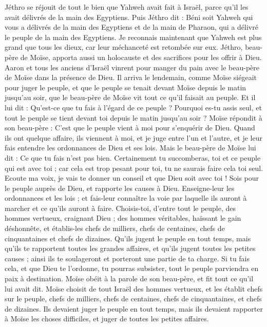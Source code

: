 \begin{multicols}{2}
Jéthro se réjouit de tout le bien que Yahweh avait fait à Israël, parce qu'il les avait délivrés de la main des Egyptiens.
Puis Jéthro dit : Béni soit Yahweh qui vous a délivrés de la main des Egyptiens et de la main de Pharaon, qui a délivré le peuple de la main des Egyptiens.
Je reconnais maintenant que Yahweh est plus grand que tous les dieux, car leur méchanceté est retombée sur eux.
Jéthro, beau-père de Moïse, apporta aussi un holocauste et des sacrifices pour les offrir à Dieu. Aaron et tous les anciens d'Israël vinrent pour manger du pain avec le beau-père de Moïse dans la présence de Dieu.
Il arriva le lendemain, comme Moïse siégeait pour juger le peuple, et que le peuple se tenait devant Moïse depuis le matin jusqu'au soir,
que le beau-père de Moïse vit tout ce qu'il faisait au peuple. Et il lui dit : Qu'est-ce que tu fais à l'égard de ce peuple ? Pourquoi es-tu assis seul, et tout le peuple se tient devant toi depuis le matin jusqu'au soir ?
Moïse répondit à son beau-père : C'est que le peuple vient à moi pour s'enquérir de Dieu.
Quand ils ont quelque affaire, ils viennent à moi, et je juge entre l'un et l'autre, et je leur fais entendre les ordonnances de Dieu et ses lois.
Mais le beau-père de Moïse lui dit : Ce que tu fais n'est pas bien.
Certainement tu succomberas, toi et ce peuple qui est avec toi ; car cela est trop pesant pour toi, tu ne saurais faire cela toi seul.
Ecoute ma voix, je vais te donner un conseil et que Dieu soit avec toi ! Sois pour le peuple auprès de Dieu, et rapporte les causes à Dieu.
Enseigne-leur les ordonnances et les lois ; et fais-leur connaître la voie par laquelle ils auront à marcher et ce qu'ils auront à faire.
Choisis-toi, d'entre tout le peuple, des hommes vertueux, craignant Dieu ; des hommes véritables, haïssant le gain déshonnête, et établis-les chefs de milliers, chefs de centaines, chefs de cinquantaines et chefs de dizaines.
Qu'ils jugent le peuple en tout temps, mais qu'ils te rapportent toutes les grandes affaires, et qu'ils jugent toutes les petites causes ; ainsi ils te soulageront et porteront une partie de ta charge.
Si tu fais cela, et que Dieu te l’ordonne, tu pourras subsister, tout le peuple parviendra en paix à destination.
Moïse obéit à la parole de son beau-père, et fit tout ce qu'il lui avait dit.
Moïse choisit de tout Israël des hommes vertueux, et les établit chefs sur le peuple, chefs de milliers, chefs de centaines, chefs de cinquantaines, et chefs de dizaines.
Ils devaient juger le peuple en tout temps, mais ils devaient rapporter à Moïse les choses difficiles, et juger de toutes les petites affaires.

\end{multicols}
